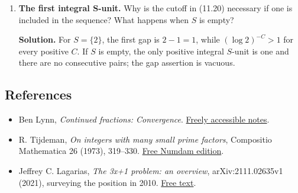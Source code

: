 \documentclass[
  11pt,
  a4paper,
]{article}
\providecommand{\tightlist}{%
  \setlength{\itemsep}{0pt}\setlength{\parskip}{0pt}}
\begin{document}
\begin{enumerate}
  \textbf{Solution.} If \(m\le k/(3\log2)\), that already bounds it.
  Otherwise (11.25) and \(\log3/\log2<2\) give
  \(\ell=\lceil k\log3/\log2\rceil\le2k\). Formula (11.24) consequently
  yields the uniform bound \[
  m<\frac{2k}{3}
  \exp\!\left(21600\log3[\max\{10,\log(4k)\}]^2\right).
  \] This also exceeds \(k/(3\log2)\), since \(2\log2>1\), so it covers
  the first case as well.
\item
  \textbf{The first integral S-unit.} Why is the cutoff in (11.20)
  necessary if one is included in the sequence? What happens when \(S\)
  is empty?

  \textbf{Solution.} For \(S=\{2\}\), the first gap is \(2-1=1\), while
  \((\log2)^{-C}>1\) for every positive \(C\). If \(S\) is empty, the
  only positive integral \(S\)-unit is one and there are no consecutive
  pairs; the gap assertion is vacuous.
\end{enumerate}

\subsection{References}\label{references}

\begin{itemize}
\tightlist
\item
  Ben Lynn, \emph{Continued fractions: Convergence}.
  \href{https://crypto.stanford.edu/pbc/notes/contfrac/converge.html}{Freely
  accessible notes}.
\item
  R. Tijdeman, \emph{On integers with many small prime factors},
  Compositio Mathematica 26 (1973), 319--330.
  \href{https://www.numdam.org/item/CM_1973__26_3_319_0/}{Free Numdam
  edition}.
\item
  Jeffrey C. Lagarias, \emph{The 3x+1 problem: an overview},
  arXiv:2111.02635v1 (2021), surveying the position in 2010.
  \href{https://arxiv.org/html/2111.02635}{Free text}.
\end{itemize}
\end{document}
